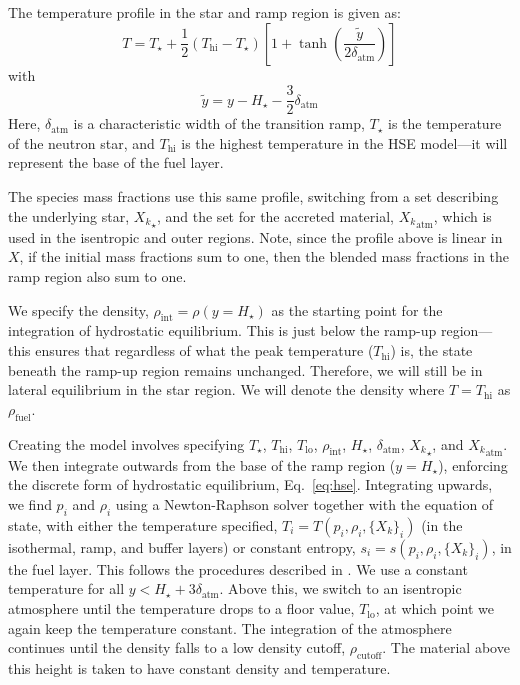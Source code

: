 \documentclass[preprint,times,tighten]{aastex63}
\begin{document}
The temperature profile in the star and ramp region is given as:
\begin{equation}
T = T_\star + \frac{1}{2} (T_\mathrm{hi} - T_\star) \left [ 1 + \tanh\left( \frac{\tilde{y}}{2 \delta_\mathrm{atm}} \right ) \right ]
\end{equation}
with
\begin{equation}
\tilde{y} = y - H_\star - \frac{3}{2} \delta_\mathrm{atm}
\end{equation}
Here, $\delta_\mathrm{atm}$ is a characteristic width of the
transition ramp, $T_\star$ is the temperature of the neutron star, and
$T_\mathrm{hi}$ is the highest temperature in the HSE model---it will
represent the base of the fuel layer.

The species mass fractions use this same profile, switching from a set
describing the underlying star, ${X_k}_\star$, and the set for the
accreted material, ${X_k}_\mathrm{atm}$, which is used in the
isentropic and outer regions.  Note, since the profile above is
linear in $X$, if the initial mass fractions sum to one, then the blended
mass fractions in the ramp region also sum to one.

We specify the density, $\rho_\mathrm{int} = \rho(y = H_\star)$ as the
starting point for the integration of hydrostatic equilibrium.  This
is just below the ramp-up region---this ensures that regardless of
what the peak temperature ($T_\mathrm{hi}$) is, the state beneath the
ramp-up region remains unchanged.  Therefore, we will still be in
lateral equilibrium in the star region.  We will denote the density
where $T = T_\mathrm{hi}$ as $\rho_\mathrm{fuel}$.


Creating the model involves specifying $T_\star$, $T_\mathrm{hi}$,
$T_\mathrm{lo}$, $\rho_\mathrm{int}$, $H_\star$,
$\delta_\mathrm{atm}$, ${X_k}_\star$, and ${X_k}_\mathrm{atm}$.  We
then integrate outwards from the base of the ramp region ($y =
H_\star$), enforcing the discrete form of hydrostatic equilibrium,
Eq.~\ref{eq:hse}.  Integrating upwards, we find $p_i$ and
$\rho_i$ using a Newton-Raphson solver together with the equation of state, with either the temperature
specified, $T_i = T(p_i, \rho_i, \{X_k\}_i)$ (in the isothermal, ramp,
and buffer layers) or constant entropy, $s_i = s(p_i, \rho_i,
\{X_k\}_i)$, in the fuel layer.  This follows the procedures described in \citet{ppm-hse}.  We
use a constant temperature for all $y < H_\star +
3\delta_\mathrm{atm}$.  Above this, we switch to an isentropic atmosphere until the
temperature drops to a floor value, $T_\mathrm{lo}$, at which point we
again keep the temperature constant.  The integration of the
atmosphere continues until the density falls to a low density cutoff,
$\rho_\mathrm{cutoff}$.  The material above this height is taken to
have constant density and temperature.
\end{document}
